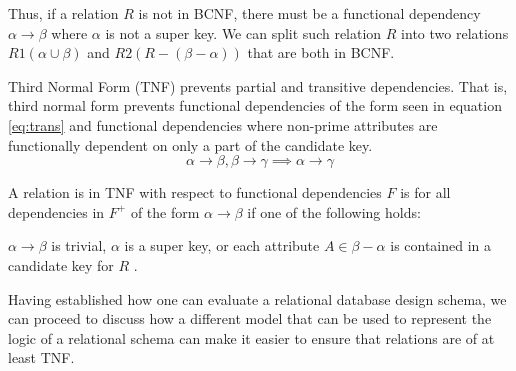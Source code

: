 Thus, if a relation $R$ is not in BCNF, there must be a functional dependency $\alpha \rightarrow \beta$ where $\alpha$ is not a super key. 
We can split such relation $R$ into two relations $R1(\alpha \cup \beta)$ and $R2(R-(\beta-\alpha))$ that are both in BCNF.

Third Normal Form (TNF) prevents partial and transitive dependencies\cite{MontayaNormalForms}.
That is, third normal form prevents functional dependencies of the form seen in equation \ref{eq:trans} 
and functional dependencies where non-prime attributes are functionally dependent on only a part of the candidate key. 
\begin{equation}\label{eq:trans}
    {\alpha} \rightarrow{\beta}, {\beta \rightarrow \gamma} \implies \alpha \rightarrow \gamma
\end{equation}

A relation is in TNF with respect to functional dependencies $F$ is for all dependencies in $F^+$ of the form $\alpha \rightarrow \beta$ if one of the following holds: 

$\alpha \rightarrow \beta$ is trivial, $\alpha$ is a super key, or each attribute $A \in \beta-\alpha$ is contained in a candidate key for $R$ \cite{DBSBook}.

Having established how one can evaluate a relational database design schema, we can proceed to discuss how a different model that can be used to represent the logic of a relational schema can make it easier to ensure that relations are of at least TNF.
